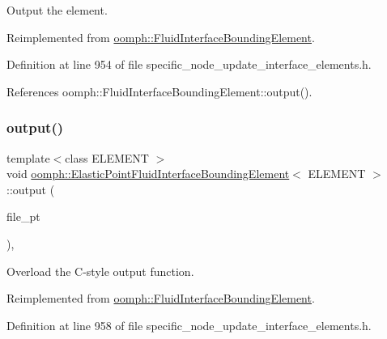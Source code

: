 Output the element. 



Reimplemented from \hyperlink{classoomph_1_1FluidInterfaceBoundingElement_af2c821d51d506221976a0c17e1615ac3}{oomph\+::\+Fluid\+Interface\+Bounding\+Element}.



Definition at line 954 of file specific\+\_\+node\+\_\+update\+\_\+interface\+\_\+elements.\+h.



References oomph\+::\+Fluid\+Interface\+Bounding\+Element\+::output().

\mbox{\label{classoomph_1_1ElasticPointFluidInterfaceBoundingElement_a61782633205934c9af1aead51640e220}} 
\subsubsection{\texorpdfstring{output()}{output()}\hspace{0.1cm}{\footnotesize\ttfamily [3/4]}}
{\footnotesize\ttfamily template$<$class E\+L\+E\+M\+E\+NT $>$ \\
void \hyperlink{classoomph_1_1ElasticPointFluidInterfaceBoundingElement}{oomph\+::\+Elastic\+Point\+Fluid\+Interface\+Bounding\+Element}$<$ E\+L\+E\+M\+E\+NT $>$\+::output (\begin{DoxyParamCaption}\item[{F\+I\+LE $\ast$}]{file\+\_\+pt }\end{DoxyParamCaption})\hspace{0.3cm}{\ttfamily [inline]}, {\ttfamily [virtual]}}



Overload the C-\/style output function. 



Reimplemented from \hyperlink{classoomph_1_1FluidInterfaceBoundingElement_a85cc62405429744e3e3585894315cb9e}{oomph\+::\+Fluid\+Interface\+Bounding\+Element}.



Definition at line 958 of file specific\+\_\+node\+\_\+update\+\_\+interface\+\_\+elements.\+h.



